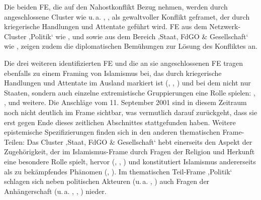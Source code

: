 Die beiden FE, die auf den Nahostkonflikt Bezug nehmen, werden durch angeschlossene Cluster wie u.\,a. , ,  als gewaltvoller Konflikt geframet, der durch kriegerische Handlungen und Attentate geführt wird. FE aus dem Netzwerk-Cluster ‚Politik` wie ,  und  sowie aus dem Bereich ‚Staat, FdGO \& Gesellschaft` wie ,  zeigen zudem die diplomatischen Bemühungen zur Lösung des Konfliktes an.

Die drei weiteren identifizierten FE und die an sie angeschlossenen FE tragen ebenfalls zu einem Framing von Islamismus bei, das durch kriegerische Handlungen und Attentate im Ausland markiert ist (, , ) und bei dem nicht nur Staaten, sondern auch einzelne extremistische Gruppierungen eine Rolle spielen:  , ,  und weitere. Die Anschläge vom 11. September 2001 sind in diesem Zeitraum noch nicht deutlich im Frame sichtbar, was vermutlich darauf zurückgeht, dass sie erst gegen Ende dieses zeitlichen Abschnittes stattgefunden haben. Weitere epistemische Spezifizierungen finden sich in den anderen thematischen Frame-Teilen: Das Cluster ‚Staat, FdGO \& Gesellschaft` hebt einerseits den Aspekt der Zugehörigkeit, der im Islamismus-Frame durch Fragen der Religion und Herkunft eine besondere Rolle spielt, hervor (, , ) und konstitutiert Islamismus andererseits als zu bekämpfendes Phänomen (, ). Im thematischen Teil-Frame ‚Politik` schlagen sich neben politischen Akteuren (u.\,a. , ) auch Fragen der Anhängerschaft (u.\,a. , , ) nieder.


